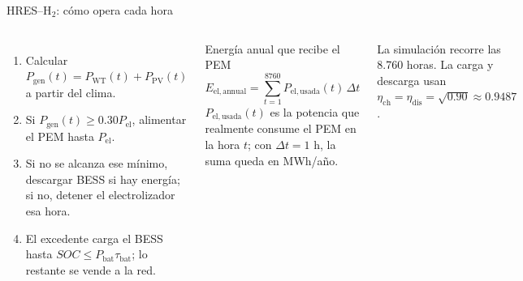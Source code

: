 \documentclass[aspectratio=169,11pt]{beamer}
\begin{document}
\begin{frame}{HRES--H$_2$: cómo opera cada hora}
  \begin{columns}[T,onlytextwidth]
      \begin{enumerate}
        \item Calcular $P_{\mathrm{gen}}(t)=P_{\mathrm{WT}}(t)+P_{\mathrm{PV}}(t)$ a partir del clima.
        \item Si $P_{\mathrm{gen}}(t)\geq0.30P_{\mathrm{el}}$, alimentar el PEM hasta $P_{\mathrm{el}}$.
        \item Si no se alcanza ese mínimo, descargar BESS si hay energía; si no, detener el electrolizador esa hora.
        \item El excedente carga el BESS hasta $SOC\leq P_{\mathrm{bat}}\tau_{\mathrm{bat}}$; lo restante se vende a la red.
      \end{enumerate}

      \begin{block}{Energía anual que recibe el PEM}
        \scriptsize
        \[
          E_{\mathrm{el,annual}}=
          \sum_{t=1}^{8760}P_{\mathrm{el,usada}}(t)\,\Delta t
        \]
        \scriptsize $P_{\mathrm{el,usada}}(t)$ es la potencia que realmente consume el PEM en la hora $t$; con $\Delta t=1$ h, la suma queda en MWh/año.
      \end{block}
      \vspace{0.15cm}
      \small La simulación recorre las 8.760 horas. La carga y descarga usan $\eta_{\mathrm{ch}}=\eta_{\mathrm{dis}}=\sqrt{0.90}\approx0.9487$.
  \end{columns}
\end{frame}
\end{document}
